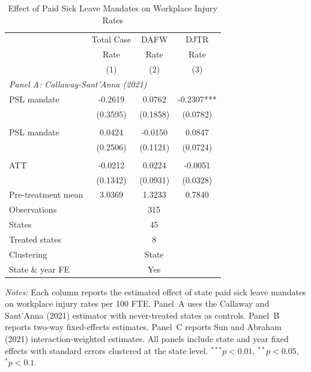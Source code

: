 \begin{table}[t]
\centering
\caption{Effect of Paid Sick Leave Mandates on Workplace Injury Rates}
\label{tab:main}
\begin{tabular}{lccc}
\toprule
 & Total Case & DAFW & DJTR \\
 & Rate & Rate & Rate \\
 & (1) & (2) & (3) \\
\midrule
\multicolumn{4}{l}{\textit{Panel A: Callaway-Sant'Anna (2021)}} \\[4pt]
PSL mandate & -0.2619 & 0.0762 & -0.2307*** \\
 & (0.3595) & (0.1858) & (0.0782) \\
\addlinespace
\multicolumn{4}{l}{\textit{Panel B: TWFE}} \\[4pt]
PSL mandate & 0.0424 & -0.0150 & 0.0847 \\
 & (0.2506) & (0.1121) & (0.0724) \\
\addlinespace
\multicolumn{4}{l}{\textit{Panel C: Sun-Abraham (2021)}} \\[4pt]
ATT & -0.0212 & 0.0224 & -0.0051 \\
 & (0.1342) & (0.0931) & (0.0328) \\
\midrule
Pre-treatment mean & 3.0369 & 1.3233 & 0.7840 \\
Observations & \multicolumn{3}{c}{315} \\
States & \multicolumn{3}{c}{45} \\
Treated states & \multicolumn{3}{c}{8} \\
Clustering & \multicolumn{3}{c}{State} \\
State \& year FE & \multicolumn{3}{c}{Yes} \\
\bottomrule
\end{tabular}
\begin{tablenotes}
\small
\item \textit{Notes:} Each column reports the estimated effect of state paid sick leave mandates on workplace injury rates per 100 FTE. Panel~A uses the Callaway and Sant'Anna (2021) estimator with never-treated states as controls. Panel~B reports two-way fixed-effects estimates. Panel~C reports Sun and Abraham (2021) interaction-weighted estimates. All panels include state and year fixed effects with standard errors clustered at the state level. $^{***}p<0.01$, $^{**}p<0.05$, $^{*}p<0.1$.
\end{tablenotes}
\end{table}

